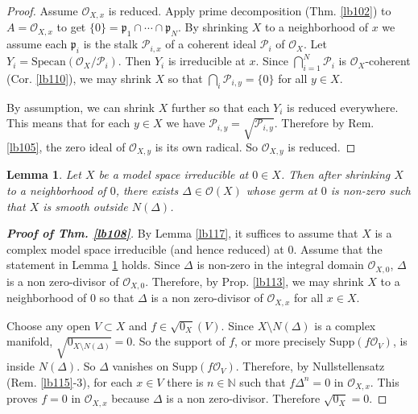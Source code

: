 \documentclass[12pt,b5paper,notitlepage]{report}
\theoremstyle{definition}
\theoremstyle{plain}
\newtheorem{lm}[df]{Lemma}
\newcommand{\scr}{\mathscr}
\newcommand{\pk}{\mathfrak p}
\newcommand{\Nbb}{\mathbb N}
\newcommand{\Supp}{\mathrm{Supp}}
\newcommand{\Specan}{\mathrm{Specan}}
\numberwithin{equation}{section}
\begin{document}
\begin{proof}
Assume $\scr O_{X,x}$ is reduced. Apply prime decomposition (Thm. \ref{lb102}) to $A=\scr O_{X,x}$ to get $\{0\}=\pk_1\cap\cdots\cap\pk_N$. By shrinking $X$ to a neighborhood of $x$ we assume each $\pk_i$ is the stalk $\scr P_{i,x}$ of a coherent ideal $\scr P_i$ of $\scr O_X$. Let $Y_i=\Specan(\scr O_X/\scr P_i)$. Then $Y_i$ is irreducible at $x$. Since $\bigcap_{i=1}^N\scr P_i$ is $\scr O_X$-coherent (Cor. \ref{lb110}), we may shrink $X$ so that $\bigcap_i \scr P_{i,y}=\{0\}$ for all $y\in X$.

By assumption, we can shrink $X$ further so that each $Y_i$ is reduced everywhere. This means that for each $y\in X$ we have $\scr P_{i,y}=\sqrt{\scr P_{i,y}}$. Therefore by Rem. \ref{lb105}, the zero ideal of $\scr O_{X,y}$ is its own radical. So $\scr O_{X,y}$ is reduced.
\end{proof}







\begin{lm}\label{lb112}
Let $X$ be a model space irreducible at $0\in X$. Then after shrinking $X$ to a neighborhood of $0$, there exists $\varDelta\in\scr O(X)$ whose germ at $0$ is non-zero such that $X$ is smooth outside $N(\varDelta)$. 
\end{lm}








\begin{proof}[\textbf{Proof of Thm. \ref{lb108}}]
By Lemma \ref{lb117}, it suffices to assume that $X$ is a complex model space irreducible (and hence reduced) at $0$.  Assume that the statement in Lemma \ref{lb112} holds. Since $\varDelta$ is non-zero in the integral domain $\scr O_{X,0}$, $\varDelta$ is a non zero-divisor of $\scr O_{X,0}$. Therefore, by Prop. \ref{lb113}, we may shrink $X$ to a neighborhood of $0$ so that $\varDelta$ is a non zero-divisor of $\scr O_{X,x}$ for all $x\in X$.

Choose any open $V\subset X$ and $f\in\sqrt{0_X}(V)$. Since $X\setminus N(\varDelta)$ is a complex manifold, $\sqrt{0_{X\setminus N(\varDelta)}}=0$. So the support of $f$, or more precisely $\Supp(f\scr O_V)$, is inside $N(\varDelta)$. So $\varDelta$ vanishes on $\Supp(f\scr O_V)$. Therefore, by Nullstellensatz (Rem. \ref{lb115}-3), for each $x\in V$ there is $n\in\Nbb$ such that $f\varDelta^n=0$ in $\scr O_{X,x}$. This proves $f=0$ in $\scr O_{X,x}$ because $\varDelta$ is a non zero-divisor. Therefore $\sqrt{0_X}=0$.
\end{proof}
\end{document}
